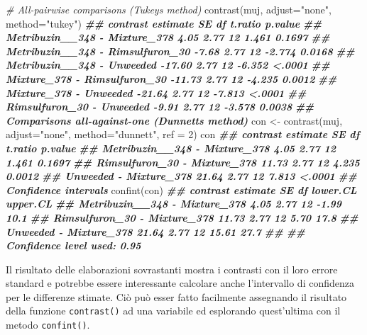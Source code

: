 \documentclass[
  12pt,
]{book}
\newenvironment{Shaded}{\begin{snugshade}}{\end{snugshade}}
\newcommand{\AttributeTok}[1]{\textcolor[rgb]{0.77,0.63,0.00}{#1}}
\newcommand{\CommentTok}[1]{\textcolor[rgb]{0.56,0.35,0.01}{\textit{#1}}}
\newcommand{\DecValTok}[1]{\textcolor[rgb]{0.00,0.00,0.81}{#1}}
\newcommand{\DocumentationTok}[1]{\textcolor[rgb]{0.56,0.35,0.01}{\textbf{\textit{#1}}}}
\newcommand{\FunctionTok}[1]{\textcolor[rgb]{0.00,0.00,0.00}{#1}}
\newcommand{\NormalTok}[1]{#1}
\newcommand{\OtherTok}[1]{\textcolor[rgb]{0.56,0.35,0.01}{#1}}
\newcommand{\StringTok}[1]{\textcolor[rgb]{0.31,0.60,0.02}{#1}}
\begin{document}
\begin{Shaded}
\begin{Highlighting}[]
\CommentTok{\# All{-}pairwise comparisons (Tukey\textquotesingle{}s method)}
\FunctionTok{contrast}\NormalTok{(muj, }\AttributeTok{adjust=}\StringTok{"none"}\NormalTok{, }\AttributeTok{method=}\StringTok{"tukey"}\NormalTok{)}
\DocumentationTok{\#\#  contrast                         estimate   SE df t.ratio p.value}
\DocumentationTok{\#\#  Metribuzin\_\_348 {-} Mixture\_378        4.05 2.77 12   1.461  0.1697}
\DocumentationTok{\#\#  Metribuzin\_\_348 {-} Rimsulfuron\_30    {-}7.68 2.77 12  {-}2.774  0.0168}
\DocumentationTok{\#\#  Metribuzin\_\_348 {-} Unweeded         {-}17.60 2.77 12  {-}6.352  \textless{}.0001}
\DocumentationTok{\#\#  Mixture\_378 {-} Rimsulfuron\_30       {-}11.73 2.77 12  {-}4.235  0.0012}
\DocumentationTok{\#\#  Mixture\_378 {-} Unweeded             {-}21.64 2.77 12  {-}7.813  \textless{}.0001}
\DocumentationTok{\#\#  Rimsulfuron\_30 {-} Unweeded           {-}9.91 2.77 12  {-}3.578  0.0038}
\DocumentationTok{\#\# Comparisons all{-}against{-}one (Dunnett\textquotesingle{}s method)}
\NormalTok{con }\OtherTok{\textless{}{-}} \FunctionTok{contrast}\NormalTok{(muj, }\AttributeTok{adjust=}\StringTok{"none"}\NormalTok{, }\AttributeTok{method=}\StringTok{"dunnett"}\NormalTok{, }\AttributeTok{ref =} \DecValTok{2}\NormalTok{)}
\NormalTok{con}
\DocumentationTok{\#\#  contrast                      estimate   SE df t.ratio p.value}
\DocumentationTok{\#\#  Metribuzin\_\_348 {-} Mixture\_378     4.05 2.77 12   1.461  0.1697}
\DocumentationTok{\#\#  Rimsulfuron\_30 {-} Mixture\_378     11.73 2.77 12   4.235  0.0012}
\DocumentationTok{\#\#  Unweeded {-} Mixture\_378           21.64 2.77 12   7.813  \textless{}.0001}
\DocumentationTok{\#\# Confidence intervals}
\FunctionTok{confint}\NormalTok{(con)}
\DocumentationTok{\#\#  contrast                      estimate   SE df lower.CL upper.CL}
\DocumentationTok{\#\#  Metribuzin\_\_348 {-} Mixture\_378     4.05 2.77 12    {-}1.99     10.1}
\DocumentationTok{\#\#  Rimsulfuron\_30 {-} Mixture\_378     11.73 2.77 12     5.70     17.8}
\DocumentationTok{\#\#  Unweeded {-} Mixture\_378           21.64 2.77 12    15.61     27.7}
\DocumentationTok{\#\# }
\DocumentationTok{\#\# Confidence level used: 0.95}
\end{Highlighting}
\end{Shaded}

\normalsize

Il risultato delle elaborazioni sovrastanti mostra i contrasti con il loro errore standard e potrebbe essere interessante calcolare anche l'intervallo di confidenza per le differenze stimate. Ciò può esser fatto facilmente assegnando il risultato della funzione \texttt{contrast()} ad una variabile ed esplorando quest'ultima con il metodo \texttt{confint()}.
\end{document}
